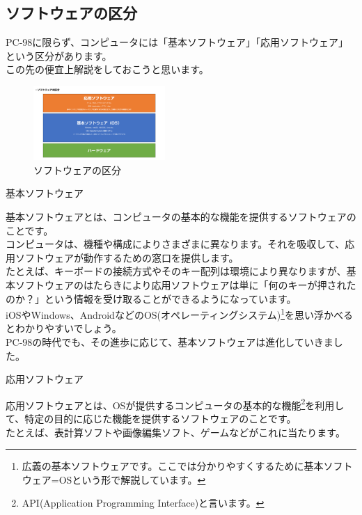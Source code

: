 \documentclass[b5paper,9pt,platex,dvipdfmx]{jsarticle}
\begin{document}
\begin{multicols}{3}
\section[short]{ソフトウェアの区分}
PC-98に限らず、コンピュータには「基本ソフトウェア」「応用ソフトウェア」という区分があります。\\
この先の便宜上解説をしておこうと思います。\\
\begin{figure}[H]
  \centering
  \includegraphics[width=5cm]{img-6.png}
  \caption{ソフトウェアの区分}
\end{figure}
\begin{enumerate}
  {\bf \item 基本ソフトウェア \\}
  基本ソフトウェアとは、コンピュータの基本的な機能を提供するソフトウェアのことです。\\
  コンピュータは、機種や構成によりさまざまに異なります。それを吸収して、応用ソフトウェアが動作するための窓口を提供します。\\
  たとえば、キーボードの接続方式やそのキー配列は環境により異なりますが、基本ソフトウェアのはたらきにより応用ソフトウェアは単に「何のキーが押されたのか？」という情報を受け取ることができるようになっています。\\
  iOSやWindows、AndroidなどのOS(オペレーティングシステム)\footnote{広義の基本ソフトウェアです。ここでは分かりやすくするために基本ソフトウェア=OSという形で解説しています。}を思い浮かべるとわかりやすいでしょう。\\
  PC-98の時代でも、その進歩に応じて、基本ソフトウェアは進化していきました。\\

  {\bf \item 応用ソフトウェア \\}
  応用ソフトウェアとは、OSが提供するコンピュータの基本的な機能\footnote{API(Application Programming Interface)と言います。}を利用して、特定の目的に応じた機能を提供するソフトウェアのことです。\\
  たとえば、表計算ソフトや画像編集ソフト、ゲームなどがこれに当たります。\\
\end{enumerate}


\end{multicols}
\end{document}
